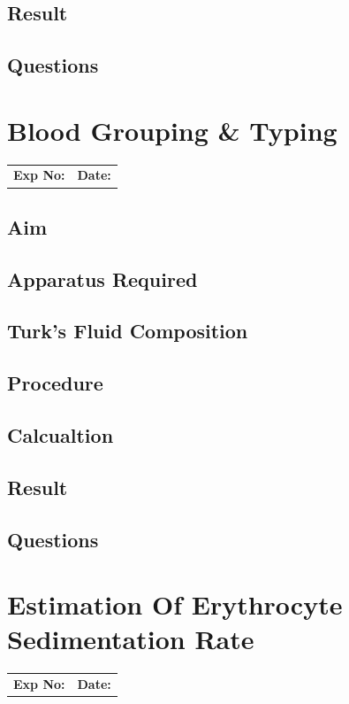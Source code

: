 \documentclass[a4paper,12pt]{book}
\begin{document}
	\section*{Result}
	\section*{Questions}

\chapter*{\centering Blood Grouping \& Typing}
		\begin{tabular}{p{5in} p{1in}}
			\textbf{Exp No:}  & \textbf{Date:}\\
		\end{tabular}

	\section*{Aim}
	\section*{Apparatus Required}
	\section*{Turk's Fluid Composition}
	\section*{Procedure}
	\section*{Calcualtion}
	\section*{Result}
	\section*{Questions}

\chapter*{\centering Estimation Of Erythrocyte Sedimentation Rate}
		\begin{tabular}{p{5in} p{1in}}
			\textbf{Exp No:}  & \textbf{Date:}\\
		\end{tabular}
\end{document}
